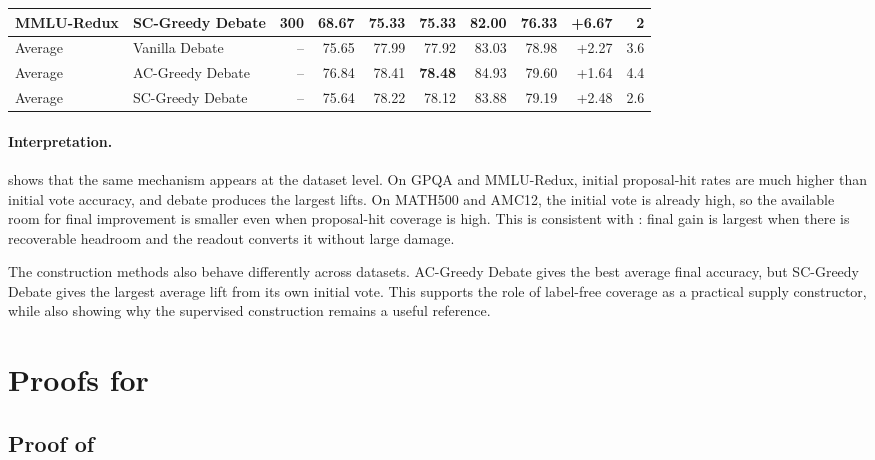 \begin{table}[t]
{\begin{tabular}{llrrrrrrrr}
MMLU-Redux & SC-Greedy Debate & 300 & 68.67 & 75.33 & 75.33 & 82.00 & 76.33 & +6.67 & 2 \\
\midrule
Average & Vanilla Debate & -- & 75.65 & 77.99 & 77.92 & 83.03 & 78.98 & +2.27 & 3.6 \\
Average & AC-Greedy Debate & -- & 76.84 & 78.41 & \textbf{78.48} & 84.93 & 79.60 & +1.64 & 4.4 \\
Average & SC-Greedy Debate & -- & 75.64 & 78.22 & 78.12 & 83.88 & 79.19 & +2.48 & 2.6 \\
\bottomrule
\end{tabular}
}
\label{tab:r5_new_seed_debate}
\end{table}

\paragraph{Interpretation.}
 shows that the same mechanism appears at the
dataset level. On GPQA and MMLU-Redux, initial proposal-hit rates are much
higher than initial vote accuracy, and debate produces the largest lifts. On
MATH500 and AMC12, the initial vote is already high, so the available room for
final improvement is smaller even when proposal-hit coverage is high. This is
consistent with : final gain is
largest when there is recoverable headroom and the readout converts it without
large damage.

The construction methods also behave differently across datasets. AC-Greedy
Debate gives the best average final accuracy, but SC-Greedy Debate gives the
largest average lift from its own initial vote. This supports the role of
label-free coverage as a practical supply constructor, while also showing why
the supervised construction remains a useful reference.

\section{Proofs for }
\label{app:proofs_headroom_lvd}

\subsection{Proof of }
\label{app:proof_recovery_damage_decomposition}

